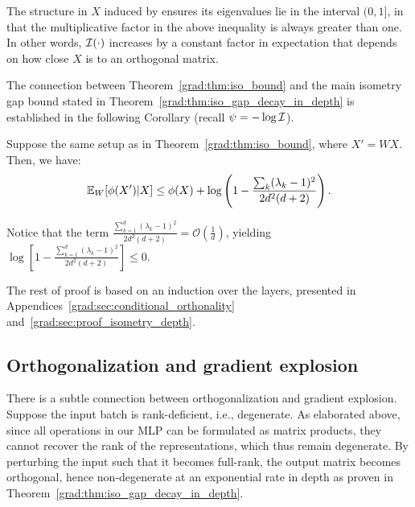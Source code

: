 The structure in $X$ induced by \BN{} ensures its eigenvalues lie in the interval $(0,1]$, in that the multiplicative factor in the above inequality is always greater than one. In other words, $\mathcal{I}(\cdot)$ increases by a constant factor in expectation that depends on how close $X$ is to an orthogonal matrix. 

The connection between Theorem~\ref{grad:thm:iso_bound} and the main isometry gap bound stated in Theorem~\ref{grad:thm:iso_gap_decay_in_depth} is established in the following Corollary (recall $\psi = -\log \mathcal{I}$). 

\begin{corollary}
Suppose the same setup as in Theorem~\ref{grad:thm:iso_bound}, where $X' = WX$. Then, we have:
\begin{align}
    \mathbb{E}_W[\phi(X') | X] \leq \phi(X) + \log \left(1 - \frac{\sum_k(\lambda_k - 1)^2}{2d^2(d+2)}\right).
\end{align}

  

\end{corollary}
  Notice that the term $\frac{\sum_{k=1}^d (\lambda_k - 1)^2}{2d^2(d+2)} = \mathcal{O}(\frac{1}{d})$, yielding $\log\left[1 - \frac{\sum_{k=1}^d (\lambda_k - 1)^2}{2d^2(d+2)} \right] \leq 0$.

The rest of proof is based on an induction over the layers, presented in Appendices~\ref{grad:sec:conditional_orthonality} and~\ref{grad:sec:proof_isometry_depth}.  

\subsection{Orthogonalization and gradient explosion}
There is a subtle connection between orthogonalization and gradient explosion. Suppose the input batch is rank-deficient, i.e., degenerate. As elaborated above, since all operations in our MLP can be formulated as matrix products, they cannot recover the rank of the representations, which thus remain degenerate. By perturbing the input such that it becomes full-rank, the output matrix becomes orthogonal, hence non-degenerate at an exponential rate in depth as proven in Theorem~\ref{grad:thm:iso_gap_decay_in_depth}. 

